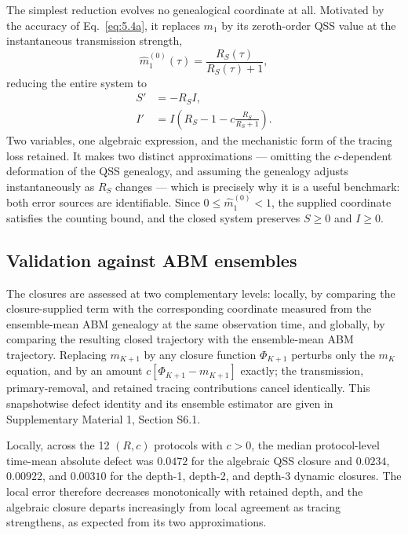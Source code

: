 \documentclass[review,12pt]{elsarticle}
\numberwithin{equation}{section}
\theoremstyle{remark}
\begin{document}
The simplest reduction evolves no genealogical coordinate at all. Motivated by the accuracy of Eq.~\eqref{eq:5.4a}, it replaces $m_1$ by its zeroth-order QSS value at the instantaneous transmission strength,
\begin{equation}
\widehat m_1^{(0)}(\tau) = \frac{R_S(\tau)}{R_S(\tau)+1},
\label{eq:7.6}
\end{equation}
reducing the entire system to
\begin{align}
S' &= -R_S I, \label{eq:7.7a}\\
I' &= I\left(R_S - 1 - c\frac{R_S}{R_S+1}\right). \label{eq:7.7b}
\end{align}
Two variables, one algebraic expression, and the mechanistic form of the tracing loss retained. It makes two distinct approximations --- omitting the $c$-dependent deformation of the QSS genealogy, and assuming the genealogy adjusts instantaneously as $R_S$ changes --- which is precisely why it is a useful benchmark: both error sources are identifiable. Since $0\leq\widehat m_1^{(0)}<1$, the supplied coordinate satisfies the counting bound, and the closed system preserves $S\geq0$ and $I\geq0$.

\subsection{Validation against ABM ensembles}\label{subsec5.2}

The closures are assessed at two complementary levels: locally, by comparing the closure-supplied term with the corresponding coordinate measured from the ensemble-mean ABM genealogy at the same observation time, and globally, by comparing the resulting closed trajectory with the ensemble-mean ABM trajectory. Replacing $m_{K+1}$ by any closure function $\Phi_{K+1}$ perturbs only the $m_K$ equation, and by an amount $c[\Phi_{K+1}-m_{K+1}]$ exactly; the transmission, primary-removal, and retained tracing contributions cancel identically. This snapshotwise defect identity and its ensemble estimator are given in Supplementary Material 1, Section S6.1.

Locally, across the 12 $(R,c)$ protocols with $c>0$, the median protocol-level time-mean absolute defect was $0.0472$ for the algebraic QSS closure and $0.0234$, $0.00922$, and $0.00310$ for the depth-1, depth-2, and depth-3 dynamic closures. The local error therefore decreases monotonically with retained depth, and the algebraic closure departs increasingly from local agreement as tracing strengthens, as expected from its two approximations.
\end{document}
